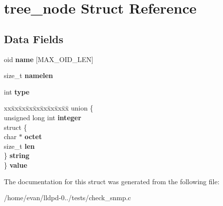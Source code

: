 \section{tree\-\_\-node \-Struct \-Reference}
\label{structtree__node}
\subsection*{\-Data \-Fields}
\begin{DoxyCompactItemize}
\item 
oid {\bfseries name} [\-M\-A\-X\-\_\-\-O\-I\-D\-\_\-\-L\-E\-N]\label{structtree__node_a58e443cdf6cb177328d82089bd8ef865}

\item 
size\-\_\-t {\bfseries namelen}\label{structtree__node_aff1f5a73cc518a5f952f008b620af7f8}

\item 
int {\bfseries type}\label{structtree__node_ac765329451135abec74c45e1897abf26}

\item 
\begin{tabbing}
xx\=xx\=xx\=xx\=xx\=xx\=xx\=xx\=xx\=\kill
union \{\\
\>unsigned long int {\bfseries integer}\\
\>struct \{\\
\>\>char $\ast$ {\bfseries octet}\\
\>\>size\_t {\bfseries len}\\
\>\} {\bfseries string}\\
\} {\bfseries value}\label{structtree__node_a3953640e1182ee6aa25dac7ee99b21a4}
\\

\end{tabbing}\end{DoxyCompactItemize}


\-The documentation for this struct was generated from the following file\-:\begin{DoxyCompactItemize}
\item 
/home/evan/lldpd-\/0../tests/check\-\_\-snmp.\-c\end{DoxyCompactItemize}
